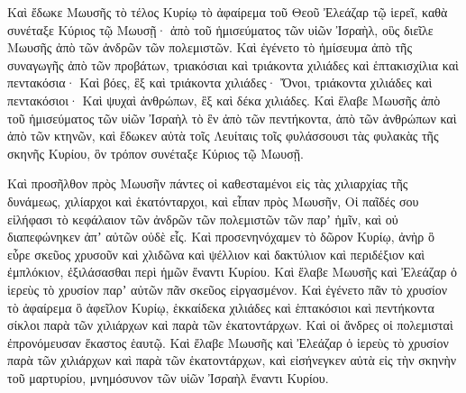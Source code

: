 {\par }{\PP {}Καὶ ἔδωκε Μωυσῆς τὸ τέλος Κυρίῳ τὸ ἀφαίρεμα τοῦ Θεοῦ Ἐλεάζαρ τῷ ἱερεῖ, καθὰ συνέταξε Κύριος τῷ Μωυσῇ·
ἀπὸ τοῦ ἡμισεύματος τῶν υἱῶν Ἰσραὴλ, οὓς διεῖλε Μωυσῆς ἀπὸ τῶν ἀνδρῶν τῶν πολεμιστῶν.
Καὶ ἐγένετο τὸ ἡμίσευμα ἀπὸ τῆς συναγωγῆς ἀπὸ τῶν προβάτων, τριακόσιαι καὶ τριάκοντα χιλιάδες καὶ ἑπτακισχίλια καὶ πεντακόσια·
Καὶ βόες, ἓξ καὶ τριάκοντα χιλιάδες·
Ὄνοι, τριάκοντα χιλιάδες καὶ πεντακόσιοι·
Καὶ ψυχαὶ ἀνθρώπων, ἓξ καὶ δέκα χιλιάδες.
Καὶ ἔλαβε Μωυσῆς ἀπὸ τοῦ ἡμισεύματος τῶν υἱῶν Ἰσραὴλ τὸ ἓν ἀπὸ τῶν πεντήκοντα, ἀπὸ τῶν ἀνθρώπων καὶ ἀπὸ τῶν κτηνῶν, καὶ ἔδωκεν αὐτὰ τοῖς Λευίταις τοῖς φυλάσσουσι τὰς φυλακὰς τῆς σκηνῆς Κυρίου, ὃν τρόπον συνέταξε Κύριος τῷ Μωυσῇ.
\par }{\PP {}Καὶ προσῆλθον πρὸς Μωυσῆν πάντες οἱ καθεσταμένοι εἰς τὰς χιλιαρχίας τῆς δυνάμεως, χιλίαρχοι καὶ ἑκατόνταρχοι,
καὶ εἶπαν πρὸς Μωυσῆν, Οἱ παῖδές σου εἰλήφασι τὸ κεφάλαιον τῶν ἀνδρῶν τῶν πολεμιστῶν τῶν παρʼ ἡμῖν, καὶ οὐ διαπεφώνηκεν ἀπʼ αὐτῶν οὐδὲ εἷς.
Καὶ προσενηνόχαμεν τὸ δῶρον Κυρίῳ, ἀνὴρ ὃ εὗρε σκεῦος χρυσοῦν καὶ χλιδῶνα καὶ ψέλλιον καὶ δακτύλιον καὶ περιδέξιον καὶ ἐμπλόκιον, ἐξιλάσασθαι περὶ ἡμῶν ἔναντι Κυρίου.
Καὶ ἔλαβε Μωυσῆς καὶ Ἐλεάζαρ ὁ ἱερεὺς τὸ χρυσίον παρʼ αὐτῶν πᾶν σκεῦος εἰργασμένον.
Καὶ ἐγένετο πᾶν τὸ χρυσίον τὸ ἀφαίρεμα ὃ ἀφεῖλον Κυρίῳ, ἑκκαίδεκα χιλιάδες καὶ ἑπτακόσιοι καὶ πεντήκοντα σίκλοι παρὰ τῶν χιλιάρχων καὶ παρὰ τῶν ἑκατοντάρχων.
Καὶ οἱ ἄνδρες οἱ πολεμισταὶ ἐπρονόμευσαν ἕκαστος ἑαυτῷ.
Καὶ ἔλαβε Μωυσῆς καὶ Ἐλεάζαρ ὁ ἱερεὺς τὸ χρυσίον παρὰ τῶν χιλιάρχων καὶ παρὰ τῶν ἑκατοντάρχων, καὶ εἰσήνεγκεν αὐτὰ εἰς τὴν σκηνὴν τοῦ μαρτυρίου, μνημόσυνον τῶν υἱῶν Ἰσραὴλ ἔναντι Κυρίου.

}
